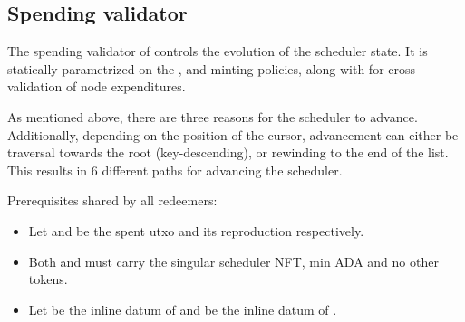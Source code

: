 \documentclass[../midgard.tex]{subfiles}
\begin{document}
\subsection{Spending validator}
\label{h:scheduler-spending-validator}

The spending validator of  controls the evolution of the scheduler state.
It is statically parametrized on the ,  and  minting policies, along with  for cross validation of node expenditures.

As mentioned above, there are three reasons for the scheduler to advance.
Additionally, depending on the position of the cursor, advancement can either be traversal towards the root (key-descending), or rewinding to the end of the list.
This results in 6 different paths for advancing the scheduler.

Prerequisites shared by all redeemers:
\begin{itemize}
  \item Let  and  be the spent utxo and its reproduction respectively.
  \item Both  and  must carry the singular scheduler NFT, min ADA and no other tokens.
  \item Let  be the inline datum of  and  be the inline datum of .
\end{itemize}
\end{document}
